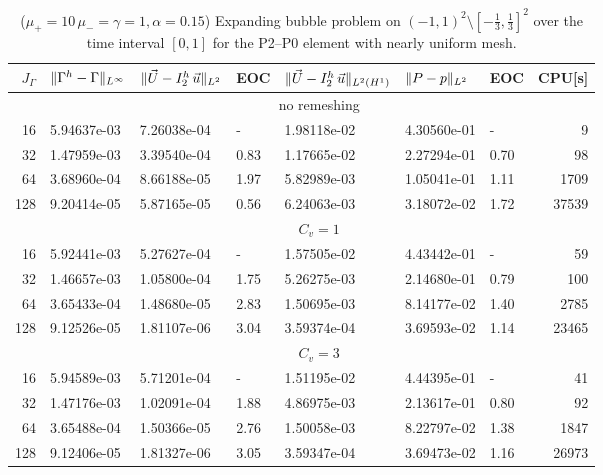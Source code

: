\begin{table}
\center
\hspace*{-3.25cm}
\begin{tabular}{rllllllr}
\hline
$J_\Gamma$ & $\|\Gamma^h - \Gamma\|_{L^\infty}$ & $\|\vec U - I^h_{2}\,\vec u\|_{L^2}$ & EOC & $\|\vec U - I^h_{2}\,\vec u\|_{L^2(H^1)}$ & $\|P - p\|_{L^2}$ & EOC
& CPU[s] \\
\hline
& \multicolumn{7}{c}{no remeshing} \\
\hline
 16 & 5.94637e-03 & 7.26038e-04 &    - & 1.98118e-02 & 4.30560e-01 &    - &
9 \\
 32 & 1.47959e-03 & 3.39540e-04 & 0.83 & 1.17665e-02 & 2.27294e-01 & 0.70 &
98 \\
 64 & 3.68960e-04 & 8.66188e-05 & 1.97 & 5.82989e-03 & 1.05041e-01 & 1.11 &
1709 \\
128 & 9.20414e-05 & 5.87165e-05 & 0.56 & 6.24063e-03 & 3.18072e-02 & 1.72 &
37539 \\
\hline
& \multicolumn{7}{c}{$C_v=1$} \\
\hline
 16 & 5.92441e-03 & 5.27627e-04 &    - & 1.57505e-02 & 4.43442e-01 &    - &
59 \\
 32 & 1.46657e-03 & 1.05800e-04 & 1.75 & 5.26275e-03 & 2.14680e-01 & 0.79 &
100 \\
 64 & 3.65433e-04 & 1.48680e-05 & 2.83 & 1.50695e-03 & 8.14177e-02 & 1.40 &
2785 \\
128 & 9.12526e-05 & 1.81107e-06 & 3.04 & 3.59374e-04 & 3.69593e-02 & 1.14 &
23465 \\
\hline
& \multicolumn{7}{c}{$C_v=3$} \\
\hline
 16 & 5.94589e-03 & 5.71201e-04 &    - & 1.51195e-02 & 4.44395e-01 &    - &
41 \\
 32 & 1.47176e-03 & 1.02091e-04 & 1.88 & 4.86975e-03 & 2.13617e-01 & 0.80 &
92 \\
 64 & 3.65488e-04 & 1.50366e-05 & 2.76 & 1.50058e-03 & 8.22797e-02 & 1.38 &
1847 \\
128 & 9.12406e-05 & 1.81327e-06 & 3.05 & 3.59347e-04 & 3.69473e-02 & 1.16 &
26973 \\
\hline
\end{tabular}
\hspace*{-3.25cm}
\caption[Stokes expanding bubble uniform mesh errors P2--P0]
{($\mu_+ = 10\,\mu_- = \gamma = 1,\alpha = 0.15$) Expanding bubble
problem on $(-1,1)^2\setminus[-\frac{1}{3},\frac{1}{3}]^2$ over the time
interval $[0,1]$ for the P2--P0 element with nearly uniform mesh.}
\label{tab:expandingbubble2Dp2p0}
\end{table}
